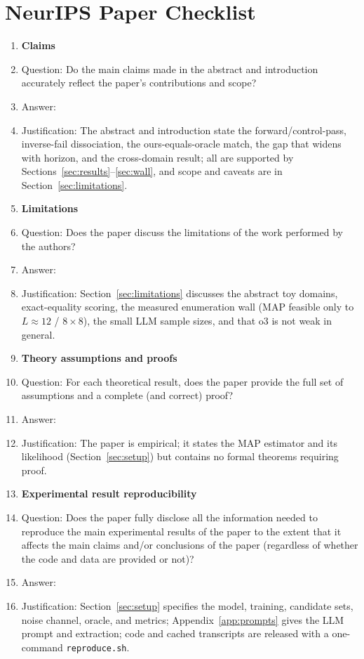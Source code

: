 \section*{NeurIPS Paper Checklist}

\begin{enumerate}

\item {\bf Claims}
    \item[] Question: Do the main claims made in the abstract and introduction accurately reflect the paper's contributions and scope?
    \item[] Answer: \answerYes{}
    \item[] Justification: The abstract and introduction state the forward/control-pass, inverse-fail dissociation, the ours-equals-oracle match, the gap that widens with horizon, and the cross-domain result; all are supported by Sections~\ref{sec:results}--\ref{sec:wall}, and scope and caveats are in Section~\ref{sec:limitations}.

\item {\bf Limitations}
    \item[] Question: Does the paper discuss the limitations of the work performed by the authors?
    \item[] Answer: \answerYes{}
    \item[] Justification: Section~\ref{sec:limitations} discusses the abstract toy domains, exact-equality scoring, the measured enumeration wall (MAP feasible only to $L\approx 12$ / $8\times8$), the small LLM sample sizes, and that o3 is not weak in general.

\item {\bf Theory assumptions and proofs}
    \item[] Question: For each theoretical result, does the paper provide the full set of assumptions and a complete (and correct) proof?
    \item[] Answer: \answerNA{}
    \item[] Justification: The paper is empirical; it states the MAP estimator and its likelihood (Section~\ref{sec:setup}) but contains no formal theorems requiring proof.

\item {\bf Experimental result reproducibility}
    \item[] Question: Does the paper fully disclose all the information needed to reproduce the main experimental results of the paper to the extent that it affects the main claims and/or conclusions of the paper (regardless of whether the code and data are provided or not)?
    \item[] Answer: \answerYes{}
    \item[] Justification: Section~\ref{sec:setup} specifies the model, training, candidate sets, noise channel, oracle, and metrics; Appendix~\ref{app:prompts} gives the LLM prompt and extraction; code and cached transcripts are released with a one-command \texttt{reproduce.sh}.


\end{enumerate}
